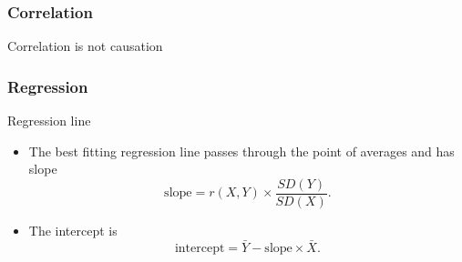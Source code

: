 \documentclass[handout]{beamer}
\begin{document}
   \begin{frame}
   \frametitle{Correlation}
   \begin{center}
   \end{center}
   Correlation is not causation
   \end{frame}


   \begin{frame} \frametitle{Regression}

   \begin{block}
   {Regression line}
   \begin{itemize}
   \item    The best fitting regression line
   passes through
   the point of averages and has slope
   $$
   \text{slope} = r(X,Y) \times \frac{SD(Y)}{SD(X)}.
   $$
   \item The intercept is
   $$
   \text{intercept} = \bar{Y} - \text{slope} \times \bar{X}.
   $$
   \end{itemize}

   \end{block}
   \end{frame}

\end{document}
